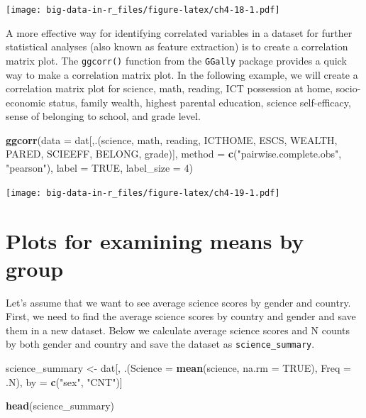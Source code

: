 \documentclass[]{book}
\newenvironment{Shaded}{\begin{snugshade}}{\end{snugshade}}
\newcommand{\DataTypeTok}[1]{\textcolor[rgb]{0.13,0.29,0.53}{#1}}
\newcommand{\DecValTok}[1]{\textcolor[rgb]{0.00,0.00,0.81}{#1}}
\newcommand{\KeywordTok}[1]{\textcolor[rgb]{0.13,0.29,0.53}{\textbf{#1}}}
\newcommand{\NormalTok}[1]{#1}
\newcommand{\OtherTok}[1]{\textcolor[rgb]{0.56,0.35,0.01}{#1}}
\newcommand{\StringTok}[1]{\textcolor[rgb]{0.31,0.60,0.02}{#1}}
\begin{document}
\texttt{[image: big-data-in-r\_files/figure-latex/ch4-18-1.pdf]}

A more effective way for identifying correlated variables in a dataset for further statistical analyses (also known as feature extraction) is to create a correlation matrix plot. The \texttt{ggcorr()} function from the \texttt{GGally} package provides a quick way to make a correlation matrix plot. In the following example, we will create a correlation matrix plot for science, math, reading, ICT possession at home, socio-economic status, family wealth, highest parental education, science self-efficacy, sense of belonging to school, and grade level.

\begin{Shaded}
\begin{Highlighting}[]
\KeywordTok{ggcorr}\NormalTok{(}\DataTypeTok{data =}\NormalTok{ dat[,.(science, math, reading, ICTHOME, ESCS,}
\NormalTok{                     WEALTH, PARED, SCIEEFF, BELONG, grade)],}
       \DataTypeTok{method =} \KeywordTok{c}\NormalTok{(}\StringTok{"pairwise.complete.obs"}\NormalTok{, }\StringTok{"pearson"}\NormalTok{),}
       \DataTypeTok{label =} \OtherTok{TRUE}\NormalTok{, }\DataTypeTok{label_size =} \DecValTok{4}\NormalTok{)}
\end{Highlighting}
\end{Shaded}

\texttt{[image: big-data-in-r\_files/figure-latex/ch4-19-1.pdf]}

\hypertarget{plots-for-examining-means-by-group}{%
\section{Plots for examining means by group}\label{plots-for-examining-means-by-group}}

Let's assume that we want to see average science scores by gender and country. First, we need to find the average science scores by country and gender and save them in a new dataset. Below we calculate average science scores and N counts by both gender and country and save the dataset as \texttt{science\_summary}.

\begin{Shaded}
\begin{Highlighting}[]
\NormalTok{science_summary <-}\StringTok{ }\NormalTok{dat[, }
\NormalTok{                       .(}\DataTypeTok{Science =} \KeywordTok{mean}\NormalTok{(science, }\DataTypeTok{na.rm =} \OtherTok{TRUE}\NormalTok{), }
                         \DataTypeTok{Freq =}\NormalTok{ .N),}
\NormalTok{                       by =}\StringTok{ }\KeywordTok{c}\NormalTok{(}\StringTok{"sex"}\NormalTok{, }\StringTok{"CNT"}\NormalTok{)]}

\KeywordTok{head}\NormalTok{(science_summary)}
\end{Highlighting}
\end{Shaded}
\end{document}
